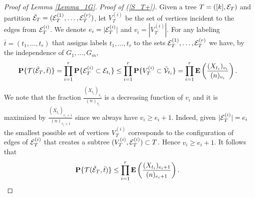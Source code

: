 \documentclass[11pt, a4paper]{article}
\newcommand{\E}{{\bf{E}}}
\newcommand{\PP}{{\bf{P}}}
\begin{document}
\begin{proof}[Proof of Lemma \ref{Lemma_1G}]
{\it Proof of (\ref{S_T+}).}
Given a tree $T=([k],{\cal E}_T)$ and  partition
${\tilde {\cal E}}_T=({\cal E}_T^{(1)},\dots,{\cal E}_T^{(r)})$, let
$V_T^{(i)}$ be the set of vertices incident to the edges from 
${\cal E}_T^{(i)}$. We denote $e_i=|{\cal E}_T^{(i)}|$ and
$v_i=|V_T^{(i)}|$.
For any labeling 
${\bar t}=(t_{1},\dots, t_{r})$ that assigns labels 
$t_1,\dots, t_r$ to the sets
${\cal E}_T^{(1)},\dots,{\cal E}_T^{(r)}$ we have, by the independence of $G_{1},\dots, G_{m}$,
\begin{displaymath}
\PP\{{\cal T}({\tilde {\cal E}}_T, {\bar t})\}
=
\prod_{i=1}^r
\PP\{{\cal E}_T^{(i)}\subset{\cal E}_{t_i}\}
\le
\prod_{i=1}^r
\PP\{V_T^{(i)}\subset{\tilde {\cal V}}_{t_i}\}
=
\prod_{i=1}^r
\E
\left(
\frac{(X_{t_i})_{v_i}}{(n)_{v_i}}
\right).
\end{displaymath}
We note that the fraction $\frac{(X_{t_i})_{v_i}}{(n)_{v_i}}$ is 
a decreasing function of $v_i$ and it is maximized by 
$\frac{(X_{t_i})_{e_i+1}}{(n)_{e_i+1}}$ since
 we always have $v_i\ge e_i+1$. Indeed,  
 given $|{\cal E}_T^{(i)}|=e_i$ the smallest possible set of vertices
$V_T^{(i)}$ 
corresponds to the configuration of edges of 
${\cal E}_T^{(i)}$ that creates a subtree $(V_T^{(i)},{\cal E}_T^{(i)})\subset T$. Hence $v_i\ge e_i+1$. It follows that 
\begin{align}
\label{Stirling}
\PP\{{\cal T}({\tilde {\cal E}}_T, {\bar t})\}
\le
\prod_{i=1}^r
\E
\left(
\frac{(X_{t_i})_{e_i+1}}{(n)_{e_i+1}}
\right).
\end{align}



\end{proof}
\end{document}
